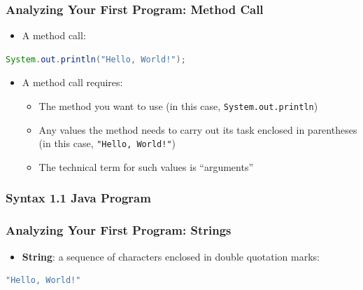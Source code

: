\documentclass{beamer}
\begin{document}
\begin{frame}[t,fragile] \frametitle{Analyzing Your First Program: Method Call} %
    \begin{itemize}
        \item A method call:
    \end{itemize}
\begin{lstlisting}[language=Java]
System.out.println("Hello, World!");
\end{lstlisting}
    \begin{itemize}
        \item A method call requires:
        \begin{itemize}
            \item The method you want to use (in this case, \texttt{System.out.println})
            \item Any values the method needs to carry out its task enclosed in parentheses (in this case, \texttt{"Hello, World!"})
            \item The technical term for such values is ``arguments''
        \end{itemize}
    \end{itemize}
\end{frame}

\begin{frame}[t,fragile] \frametitle{Syntax 1.1 Java Program} %
\end{frame}

\begin{frame}[t,fragile] \frametitle{Analyzing Your First Program: Strings} %
    \begin{itemize}
        \item \textbf{String}: a sequence of characters enclosed in double quotation marks:
    \end{itemize}
\begin{lstlisting}[language=Java]
"Hello, World!"
\end{lstlisting}
\end{frame}
\end{document}

